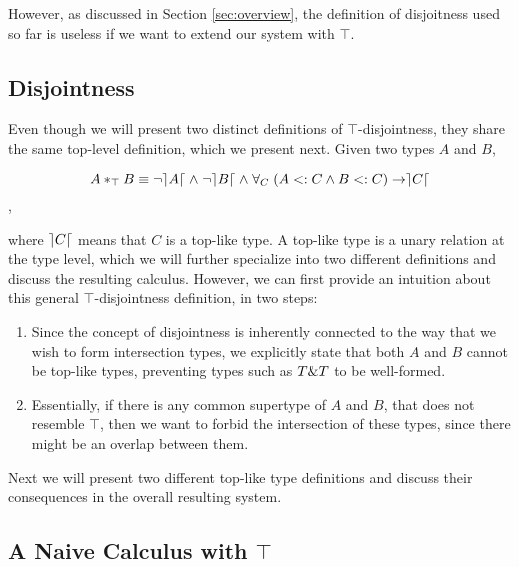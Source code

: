 However, as discussed in Section \ref{sec:overview}, the definition of disjoitness used so far 
is useless if we want to extend our system with $\top$. 

\subsection{Disjointness} 

Even though we will present two distinct definitions of $\top$-disjointness, they share the same top-level definition, which
we present next.
Given two types $A$ and $B$, 

\[A *_{\top} B \equiv \neg \rceil A \lceil \; \wedge \; \neg \rceil B \lceil \; \wedge \; 
\forall_C \; ( A <: C \wedge B <: C ) \rightarrow \rceil C \lceil \],

where $\rceil C \lceil$ means that $C$ is a top-like type.
A top-like type is a unary relation at the type level, which we will further specialize into two different definitions 
and discuss the resulting calculus.
However, we can first provide an intuition about this general $\top$-disjointness definition, in two steps:
\begin{enumerate}
\item Since the concept of disjointness is inherently connected to the way that we wish to form intersection types,
we explicitly state that both $A$ and $B$ cannot be top-like types, preventing types such as $T \& T$ to be well-formed.
\item Essentially, if there is any common supertype of $A$ and $B$, that does not resemble $\top$, then we want to forbid the 
intersection of these types, since there might be an overlap between them. 
\end{enumerate}

Next we will present two different top-like type definitions and discuss their consequences in the overall resulting system.

\subsection{A Naive Calculus with $\top$}

